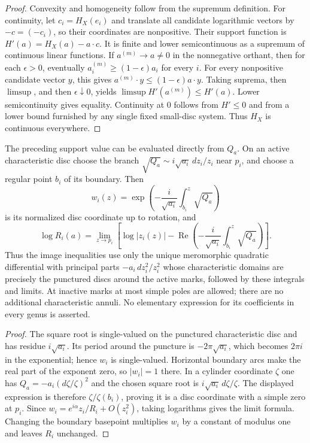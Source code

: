\begin{proof}
Convexity and homogeneity follow from the supremum definition. For continuity, let $c_i=H_X(e_i)$ and translate all candidate logarithmic vectors by $-c=( -c_i)$, so their coordinates are nonpositive. Their support function is $H'(a)=H_X(a)-a\cdot c$. It is finite and lower semicontinuous as a supremum of continuous linear functions. If $a^{(m)}\to a\ne0$ in the nonnegative orthant, then for each $\epsilon>0$, eventually $a_i^{(m)}\geq(1-\epsilon)a_i$ for every $i$. For every nonpositive candidate vector $y$, this gives
$a^{(m)}\cdot y\leq(1-\epsilon)a\cdot y$. Taking suprema, then $\limsup$, and then $\epsilon\downarrow0$, yields $\limsup H'(a^{(m)})\leq H'(a)$. Lower semicontinuity gives equality. Continuity at $0$ follows from $H'\leq0$ and from a lower bound furnished by any single fixed small-disc system. Thus $H_X$ is continuous everywhere.
\end{proof}

\begin{proposition}
\label{C:A2b-support-integral}
The preceding support value can be evaluated directly from $Q_a$. On an active characteristic disc choose the branch
$\sqrt{Q_a}\sim i\sqrt{a_i}\,dz_i/z_i$ near $p_i$, and choose a regular point $b_i$ of its boundary. Then
\[
 w_i(z)=\exp\!\left(-\frac{i}{\sqrt{a_i}}
                  \int_{b_i}^{z}\sqrt{Q_a}\right)
\]
is its normalized disc coordinate up to rotation, and
\[
 \log R_i(a)=\lim_{z\to p_i}
 \left[\log|z_i(z)|-
 \operatorname{Re}\!\left(-\frac{i}{\sqrt{a_i}}
                  \int_{b_i}^{z}\sqrt{Q_a}\right)\right].
\]
Thus the image inequalities use only the unique meromorphic quadratic differential with principal parts $-a_i\,dz_i^2/z_i^2$ whose characteristic domains are precisely the punctured discs around the active marks, followed by these integrals and limits. At inactive marks at most simple poles are allowed; there are no additional characteristic annuli. No elementary expression for its coefficients in every genus is asserted.
\end{proposition}
\begin{proof}
The square root is single-valued on the punctured characteristic disc and has residue $i\sqrt{a_i}$. Its period around the puncture is $-2\pi\sqrt{a_i}$, which becomes $2\pi i$ in the exponential; hence $w_i$ is single-valued. Horizontal boundary arcs make the real part of the exponent zero, so $|w_i|=1$ there. In a cylinder coordinate $\zeta$ one has $Q_a=-a_i(d\zeta/\zeta)^2$ and the chosen square root is $i\sqrt{a_i}\,d\zeta/\zeta$. The displayed expression is therefore $\zeta/\zeta(b_i)$, proving it is a disc coordinate with a simple zero at $p_i$. Since $w_i=e^{i\alpha}z_i/R_i+O(z_i^2)$, taking logarithms gives the limit formula. Changing the boundary basepoint multiplies $w_i$ by a constant of modulus one and leaves $R_i$ unchanged.
\end{proof}


